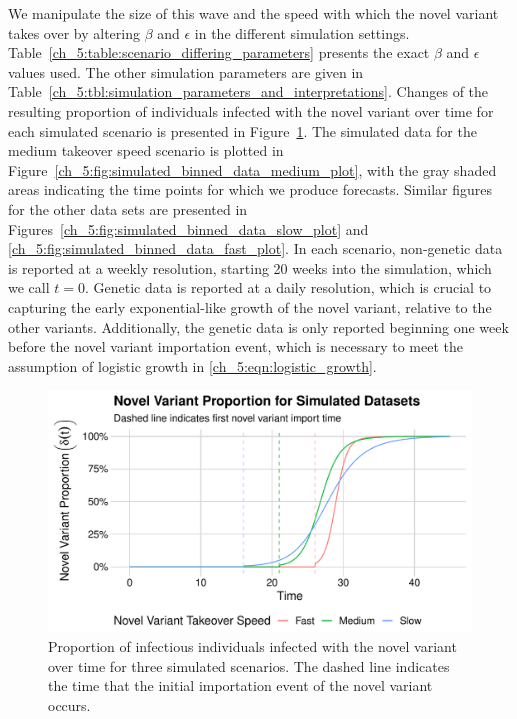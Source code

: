 We manipulate the size of this wave and the speed with which the novel variant takes over by altering \( \beta \) and \( \epsilon \) in the different simulation settings.
Table~\ref{ch_5:table:scenario_differing_parameters} presents the exact \( \beta \) and \( \epsilon \) values used.
The other simulation parameters are given in Table~\ref{ch_5:tbl:simulation_parameters_and_interpretations}.
Changes of the resulting proportion of individuals infected with the novel variant over time for each simulated scenario is presented in Figure~\ref{ch_5:fig:proportion_novel_variant_simulated_data_plot}.
The simulated data for the medium takeover speed scenario is plotted in Figure~\ref{ch_5:fig:simulated_binned_data_medium_plot}, with the gray shaded areas indicating the time points for which we produce forecasts.
Similar figures for the other data sets are presented in Figures~\ref{ch_5:fig:simulated_binned_data_slow_plot} and \ref{ch_5:fig:simulated_binned_data_fast_plot}.
In each scenario, non-genetic data is reported at a weekly resolution, starting 20 weeks into the simulation, which we call \( t = 0 \).
Genetic data is reported at a daily resolution, which is crucial to capturing the early exponential-like growth of the novel variant, relative to the other variants.
Additionally, the genetic data is only reported beginning one week before the novel variant importation event, which is necessary to meet the assumption of logistic growth in \eqref{ch_5:eqn:logistic_growth}.

\begin{figure}
    \centering
    \includegraphics[width=1.0\columnwidth]{proportion_novel_variant_simulated_data_plot}
    \caption[Proportion of infectious individuals infected with the novel variant over time for three simulated scenarios.]{Proportion of infectious individuals infected with the novel variant over time for three simulated scenarios.
    The dashed line indicates the time that the initial importation event of the novel variant occurs.}
    \label{ch_5:fig:proportion_novel_variant_simulated_data_plot}
\end{figure}

